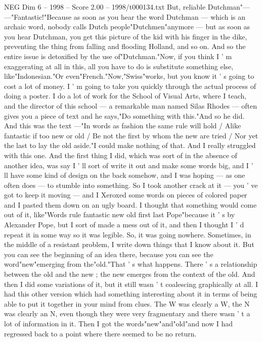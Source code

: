 \begin{textsample}{NEG Dim 6 – 1998 – Score 2.00 – 1998/t000134.txt}
But, reliable Dutchman"— —"Fantastic!"Because as soon as you hear the word Dutchman — which is an archaic word, nobody calls Dutch people"Dutchmen"anymore — but as soon as you hear Dutchman, you get this picture of the kid with his finger in the dike, preventing the thing from falling and flooding Holland, and so on.
And so the entire issue is detoxified by the use of"Dutchman."Now, if you think I ' m exaggerating at all in this, all you have to do is substitute something else, like"Indonesian."Or even"French."Now,"Swiss"works, but you know it ' s going to cost a lot of money.
I ' m going to take you quickly through the actual process of doing a poster.
I do a lot of work for the School of Visual Arts, where I teach, and the director of this school — a remarkable man named Silas Rhodes — often gives you a piece of text and he says,"Do something with this."And so he did.
And this was the text —"In words as fashion the same rule will hold / Alike fantastic if too new or old / Be not the first by whom the new are tried / Nor yet the last to lay the old aside."I could make nothing of that.
And I really struggled with this one.
And the first thing I did, which was sort of in the absence of another idea, was say I ' ll sort of write it out and make some words big, and I ' ll have some kind of design on the back somehow, and I was hoping — as one often does — to stumble into something.
So I took another crack at it — you ' ve got to keep it moving — and I Xeroxed some words on pieces of colored paper and I pasted them down on an ugly board.
I thought that something would come out of it, like"Words rule fantastic new old first last Pope"because it ' s by Alexander Pope, but I sort of made a mess out of it, and then I thought I ' d repeat it in some way so it was legible.
So, it was going nowhere.
Sometimes, in the middle of a resistant problem, I write down things that I know about it.
But you can see the beginning of an idea there, because you can see the word"new"emerging from the"old."That ' s what happens.
There ' s a relationship between the old and the new ; the new emerges from the context of the old.
And then I did some variations of it, but it still wasn ' t coalescing graphically at all.
I had this other version which had something interesting about it in terms of being able to put it together in your mind from clues.
The W was clearly a W, the N was clearly an N, even though they were very fragmentary and there wasn ' t a lot of information in it.
Then I got the words"new"and"old"and now I had regressed back to a point where there seemed to be no return.

\end{textsample}
